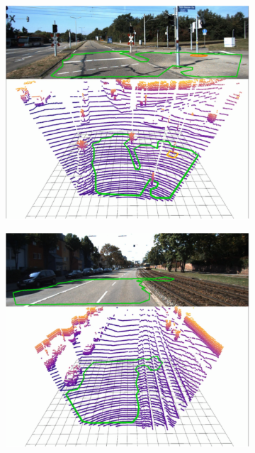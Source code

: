 \begin{figure}[ht]
\begin{subfigure}{.45\linewidth}
    \centering\includegraphics[clip, trim=0.1cm 0cm 0.1cm 0cm, width=.8\linewidth]{chapter_3_polylidar3d/imgs/kitti/kitti_results-kitti_c.pdf}
    \caption{\label{fig:ch3_kitti_c}}
  \end{subfigure}
  \hspace{0.1cm}
  \begin{subfigure}{.45\linewidth}
    \centering\includegraphics[clip, trim=0cm 0cm 0.1cm 0.0cm, width=.8\linewidth]{chapter_3_polylidar3d/imgs/kitti/kitti_results-kitti_f.pdf}
    \caption{\label{fig:ch3_kitti_f}}
  \end{subfigure}

\end{figure}
